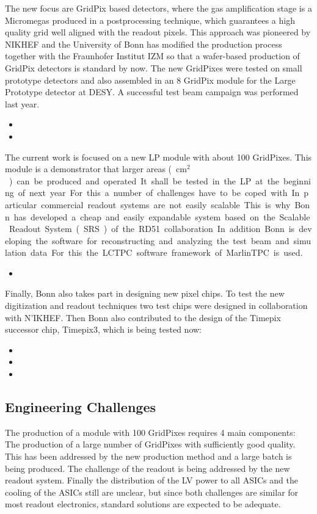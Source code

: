 The new focus are GridPix based detectors, where the gas amplification stage is a Micromegas produced in a postprocessing technique, which guarantees a high quality grid well aligned with the readout pixels. This approach was pioneered by NIKHEF and the University of Bonn has modified the production process together with the Fraunhofer Institut IZM so that a wafer-based production of GridPix detectors is standard by now. The new GridPixes were tested on small prototype detectors and also assembled in an 8 GridPix module for the Large Prototype detector at DESY. A successful test beam campaign was performed last year.
\begin{itemize}
\item {}
\item {}
\end{itemize}
The current work is focused on a new LP module with about 100 GridPixes. This module is a demonstrator that larger areas (~\unit[400]{$\mathrm{cm}^2$}) can be produced and operated. It shall be tested in the LP at the beginning of next year. For this a number of challenges have to be coped with. In particular commercial readout systems are not easily scalable. This is why Bonn has developed a cheap and easily expandable system based on the Scalable Readout System (SRS) of the RD51 collaboration.
In addition Bonn is developing the software for reconstructing and analyzing the test beam and simulation data. For this the LCTPC software framework of MarlinTPC is used.
\begin{itemize}
\item {}
\end{itemize}
Finally, Bonn also takes part in designing new pixel chips. To test the new digitization and readout techniques two test chips were designed in collaboration with N'IKHEF. Then Bonn also contributed to the design of the Timepix successor chip, Timepix3, which is being tested now:
\begin{itemize}
\item {}
\item {}
\item {}
\end{itemize}

\subsection{Engineering Challenges}
The production of a module with 100 GridPixes requires 4 main components: The production of a
large number of GridPixes with sufficiently good quality. This has been addressed by the new production method and a large batch is being produced. The challenge of the readout is being addressed by the new readout system. Finally the distribution of the LV power to all ASICs and the cooling of the ASICs still are unclear, but since both challenges are similar for most readout electronics, standard solutions are expected to be adequate.


